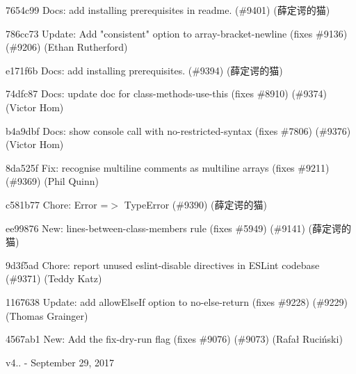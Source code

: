 \begin{DoxyItemize}
\item 7654c99 Docs\+: add installing prerequisites in readme. (\#9401) (薛定谔的猫)
\item 786cc73 Update\+: Add "{}consistent"{} option to array-\/bracket-\/newline (fixes \#9136) (\#9206) (Ethan Rutherford)
\item e171f6b Docs\+: add installing prerequisites. (\#9394) (薛定谔的猫)
\item 74dfc87 Docs\+: update doc for class-\/methods-\/use-\/this (fixes \#8910) (\#9374) (Victor Hom)
\item b4a9dbf Docs\+: show console call with no-\/restricted-\/syntax (fixes \#7806) (\#9376) (Victor Hom)
\item 8da525f Fix\+: recognise multiline comments as multiline arrays (fixes \#9211) (\#9369) (Phil Quinn)
\item c581b77 Chore\+: Error =\texorpdfstring{$>$}{>} Type\+Error (\#9390) (薛定谔的猫)
\item ee99876 New\+: lines-\/between-\/class-\/members rule (fixes \#5949) (\#9141) (薛定谔的猫)
\item 9d3f5ad Chore\+: report unused eslint-\/disable directives in ESLint codebase (\#9371) (Teddy Katz)
\item 1167638 Update\+: add allow\+Else\+If option to no-\/else-\/return (fixes \#9228) (\#9229) (Thomas Grainger)
\item 4567ab1 New\+: Add the fix-\/dry-\/run flag (fixes \#9076) (\#9073) (Rafał Ruciński)
\end{DoxyItemize}

v4.. -\/ September 29, 2017


